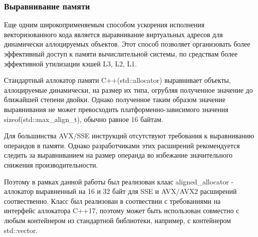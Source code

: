 \subsubsection{Выравнивание памяти}

Еще одним широкоприменяемым способом ускорения исполнения векторизованного кода является выравнивание виртуальных адресов
для динамически аллоцируемых объектов. Этот способ позволяет организовать более эффективный доступ к памяти вычислительной системы,
по средствам более эффективной утилизации кэшей L3, L2, L1.

Стандартный аллокатор памяти C++(std::allocator) выравнивает объекты, аллоцируемые динамически, на размер их типа,
огрубляя полученное значение до ближайшей степени двойки.
Однако полученное таким образом значение выравнивания не может превосходить платформенно-зависимого значения sizeof(std::max\_align\_t),
обычно равное 16 байтам.

Для большинства AVX/SSE инструкций отсутствуют требования к выравниванию операндов в памяти. 
Однако разработчиками этих расширений рекомендуется следить за выравниванием на размер операнда
во избежание значительного снижения производительности.

Поэтому в рамках данной работы был реализован клаас aligned\_allocator - аллокатор выравненный
на 16 и 32 байт для SSE и AVX/AVX2 расширений соотвественно.
Класс был реализован в соотвествии с требованиями на интерфейс аллокатора C++17, поэтому может быть использован совместно с любым
контейнером из стандартной библиотеки, например, с контейнером std::vector.

\clearpage
